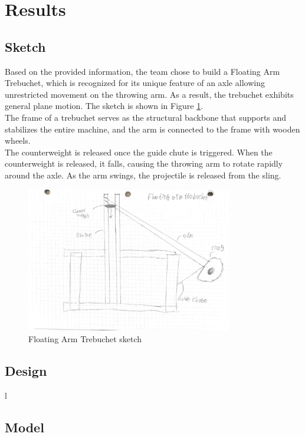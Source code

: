 \documentclass[12pt, titlepage]{article}
\begin{document}
    \section{Results}
    \subsection{Sketch}
    Based on the provided information, the team chose to build a Floating Arm 
    Trebuchet, which is recognized for its unique feature of an axle allowing 
    unrestricted movement on the throwing arm. As a result, the trebuchet 
    exhibits general plane motion. The sketch is shown in Figure \ref{sketch}.\\[10pt]
    The frame of a trebuchet serves as the structural backbone that supports 
    and stabilizes the entire machine, and the arm is connected to the frame
    with wooden wheels.\\[10pt]
    The counterweight is released once the guide chute is triggered.
    When the counterweight is released, it falls, causing the throwing arm 
    to rotate rapidly around the axle. As the arm swings, the projectile 
    is released from the sling.
    \begin{figure}[t]                                  
    \centering
    \includegraphics[width=0.8\textwidth]{sketch.jpeg}
    \caption{Floating Arm Trebuchet sketch\label{sketch}}
    \end{figure}
    \newpage
    \subsection{Design}
    l
    \newpage
    \subsection{Model}
    \newpage
\end{document}
